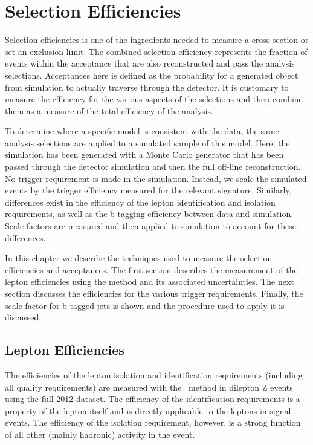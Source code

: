 \chapter{Selection Efficiencies}
\label {ch:eff}
Selection efficiencies is one of the ingredients needed to measure a cross
section or set an exclusion limit. The combined selection efficiency represents
the fraction of events within the acceptance that are also reconstructed and
pass the analysis selections. Acceptances here is defined as the probability
for a generated object from simulation to actually traverse through the
detector. It is customary to measure the efficiency for the various aspects of
the selections and then combine them as a measure of the total efficiency of
the analysis.

To determine where a specific model is consistent with the data, the same
analysis selections are applied to a simulated sample of this model. Here, the
simulation has been generated with a Monte Carlo generator that has been
passed through the detector simulation and then the full off-line reconstruction.
No trigger requirement is made in the simulation. Instead, we scale the
simulated events by the trigger efficiency measured for the relevant signature.
Similarly, differences exist in the efficiency of the lepton identification
and isolation requirements, as well as the b-tagging efficiency between data
and simulation. Scale factors are measured and then applied to simulation to
account for these differences.

In this chapter we describe the techniques used to measure the selection
efficiencies and acceptances. The first section describes the measurement of
the lepton efficiencies using the \tnp method and its associated uncertainties.
The next section discusses the efficiencies for the various trigger
requirements. Finally, the \dmc scale factor for b-tagged jets is shown and the
procedure used to apply it is discussed.

\section{Lepton Efficiencies}
\label {sec:eff_lep}
The efficiencies of the lepton isolation and identification requirements
(including all quality requirements) are measured with the \tnp~method
in dilepton Z events using the full 2012 dataset. The efficiency of the
identification requirements is a property of the lepton itself and is directly
applicable to the leptons in signal events. The efficiency of the isolation
requirement, however, is a strong function of all other (mainly hadronic)
activity in the event. 

